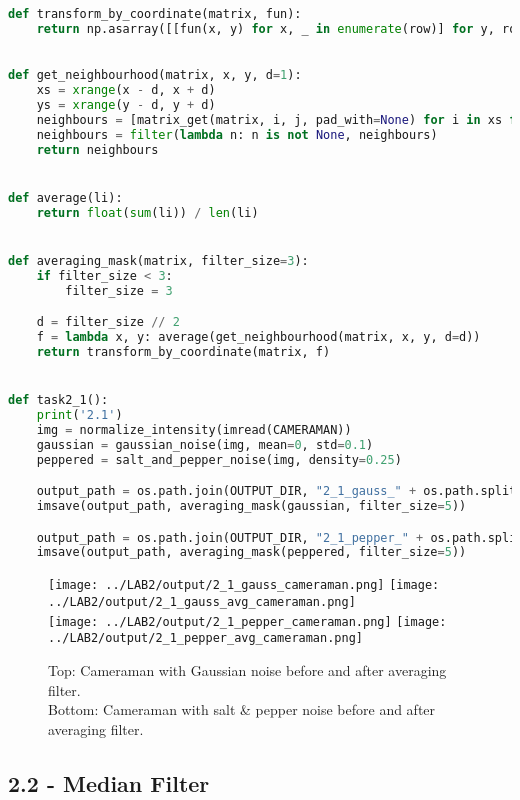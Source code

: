 \begin{lstlisting}[language=Python, label=averaging_filter, caption=Averaging Filter]
def transform_by_coordinate(matrix, fun):
    return np.asarray([[fun(x, y) for x, _ in enumerate(row)] for y, row in enumerate(matrix)])

    
def get_neighbourhood(matrix, x, y, d=1):
    xs = xrange(x - d, x + d)
    ys = xrange(y - d, y + d)
    neighbours = [matrix_get(matrix, i, j, pad_with=None) for i in xs for j in ys]
    neighbours = filter(lambda n: n is not None, neighbours)
    return neighbours


def average(li):
    return float(sum(li)) / len(li)


def averaging_mask(matrix, filter_size=3):
    if filter_size < 3:
        filter_size = 3

    d = filter_size // 2
    f = lambda x, y: average(get_neighbourhood(matrix, x, y, d=d))
    return transform_by_coordinate(matrix, f)


def task2_1():
    print('2.1')
    img = normalize_intensity(imread(CAMERAMAN))
    gaussian = gaussian_noise(img, mean=0, std=0.1)
    peppered = salt_and_pepper_noise(img, density=0.25)

    output_path = os.path.join(OUTPUT_DIR, "2_1_gauss_" + os.path.split(CAMERAMAN)[-1])
    imsave(output_path, averaging_mask(gaussian, filter_size=5))

    output_path = os.path.join(OUTPUT_DIR, "2_1_pepper_" + os.path.split(CAMERAMAN)[-1])
    imsave(output_path, averaging_mask(peppered, filter_size=5))
\end{lstlisting}

\newpage
\begin{figure}[h!]
    \centering
    \texttt{[image: ../LAB2/output/2\_1\_gauss\_cameraman.png]}
    \texttt{[image: ../LAB2/output/2\_1\_gauss\_avg\_cameraman.png]} \\
    \texttt{[image: ../LAB2/output/2\_1\_pepper\_cameraman.png]}
    \texttt{[image: ../LAB2/output/2\_1\_pepper\_avg\_cameraman.png]}
    \caption{Top: Cameraman with Gaussian noise before and after averaging filter. \\ Bottom: Cameraman with salt \& pepper noise before and after averaging filter.}
    \label{avg_filter_results}
\end{figure}


\newpage
\subsection*{2.2 - Median Filter}

